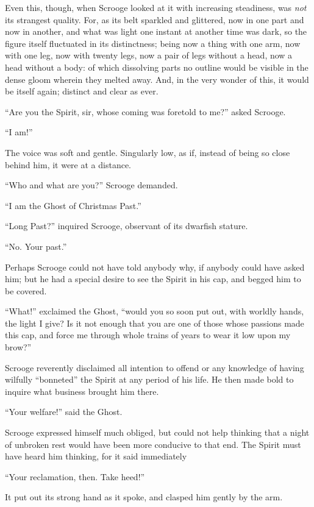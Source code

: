 \documentclass[paper=5.5in:8.5in,BCOR=10mm,twoside,DIV=15,12pt,usegeometry,openany]{scrbook} %
\begin{document}
Even this, though, when Scrooge looked at it with increasing steadiness, was \textit{not} its strangest quality. For, as its belt sparkled and glittered, now in one part and now in another, and what was light one instant at another time was dark, so the figure itself fluctuated in its distinctness; being now a thing with one arm, now with one leg, now with twenty legs, now a pair of legs without a head, now a head without a body: of which dissolving parts no outline would be visible in the dense gloom wherein they melted away. And, in the very wonder of this, it would be itself again; distinct and clear as ever.

\enquote{Are you the Spirit, sir, whose coming was foretold to me?} asked Scrooge.

\enquote{I am!}

The voice was soft and gentle. Singularly low, as if, instead of being so close behind him, it were at a distance.

\enquote{Who and what are you?} Scrooge demanded.

\enquote{I am the Ghost of Christmas Past.}

\enquote{Long Past?} inquired Scrooge, observant of its dwarfish stature.

\enquote{No. Your past.}

Perhaps Scrooge could not have told anybody why, if anybody could have asked him; but he had a special desire to see the Spirit in his cap, and begged him to be covered.

\enquote{What!} exclaimed the Ghost, \enquote{would you so soon put out, with worldly hands, the light I give? Is it not enough that you are one of those whose passions made this cap, and force me through whole trains of years to wear it low upon my brow?}

Scrooge reverently disclaimed all intention to offend or any knowledge of having wilfully \enquote{bonneted} the Spirit at any period of his life. He then made bold to inquire what business brought him there.

\enquote{Your welfare!} said the Ghost.

Scrooge expressed himself much obliged, but could not help thinking that a night of unbroken rest would have been more conducive to that end. The Spirit must have heard him thinking, for it said immediately\textemdash 

\enquote{Your reclamation, then. Take heed!}

It put out its strong hand as it spoke, and clasped him gently by the arm.
\end{document}
